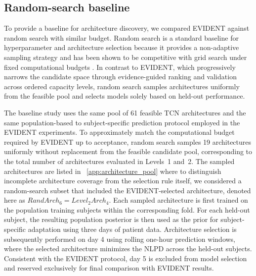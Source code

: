 \documentclass[preprint,12pt]{elsarticle}
\begin{document}
\subsection{Random-search baseline}
\label{sec:baseline}

To provide a baseline for architecture discovery, we compared EVIDENT against random search with similar budget. Random search is a standard baseline for hyperparameter and architecture selection because it provides a non-adaptive sampling strategy and has been shown to be competitive with grid search under fixed computational budgets \cite{bergstra2012random}. In contrast to EVIDENT, 
which progressively narrows the candidate space through evidence-guided ranking and validation across ordered capacity levels, random search samples architectures uniformly from the feasible pool and selects models solely based on held-out performance.

%

The baseline study uses the same pool of 61 feasible TCN architectures and the same population-based to subject-specific prediction protocol employed in the EVIDENT experiments. To approximately match the computational budget required by EVIDENT up to acceptance, random search samples 19 architectures uniformly without replacement from the feasible candidate pool, corresponding to the total number of architectures evaluated in Levels~1 and~2. The sampled architectures are listed in ~\ref{app:architecture_pool}
where to distinguish incomplete architecture coverage from the selection rule itself, we considered a random-search subset that included the EVIDENT-selected architecture, denoted here as $RandArch_6=Level_2Arch_4$.
Each sampled architecture is first trained on the population training subjects within the corresponding fold. For each held-out subject, the resulting population posterior is then used as the prior for subject-specific adaptation using three days of patient data. Architecture selection is subsequently performed on day 4 using rolling one-hour prediction windows, where the selected architecture minimizes the NLPD across the held-out subjects. Consistent with the EVIDENT protocol, day 5 is excluded from model selection and reserved exclusively for final comparison with EVIDENT results.
\end{document}
